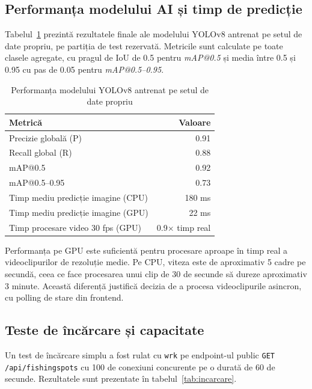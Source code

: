 \subsection{Performanța modelului AI și timp de predicție}

Tabelul~\ref{tab:performanta-ai} prezintă rezultatele finale ale modelului YOLOv8 antrenat pe setul de date propriu, pe partiția de test rezervată. Metricile sunt calculate pe toate clasele agregate, cu pragul de IoU de 0.5 pentru \textit{mAP@0.5} și media între 0.5 și 0.95 cu pas de 0.05 pentru \textit{mAP@0.5--0.95}.

\begin{table}[H]
\centering
\caption{Performanța modelului YOLOv8 antrenat pe setul de date propriu}
\label{tab:performanta-ai}
\begin{tabular}{lr}
\hline
\textbf{Metrică} & \textbf{Valoare} \\
\hline
Precizie globală (P)           & 0.91 \\
Recall global (R)              & 0.88 \\
mAP@0.5                        & 0.92 \\
mAP@0.5--0.95                  & 0.73 \\
Timp mediu predicție imagine (CPU) & 180 ms \\
Timp mediu predicție imagine (GPU) & 22 ms \\
Timp procesare video 30 fps (GPU)  & 0.9$\times$ timp real \\
\hline
\end{tabular}
\end{table}

Performanța pe GPU este suficientă pentru procesare aproape în timp real a videoclipurilor de rezoluție medie. Pe CPU, viteza este de aproximativ 5 cadre pe secundă, ceea ce face procesarea unui clip de 30 de secunde să dureze aproximativ 3 minute. Această diferență justifică decizia de a procesa videoclipurile asincron, cu polling de stare din frontend.

\subsection{Teste de încărcare și capacitate}

Un test de încărcare simplu a fost rulat cu \texttt{wrk} pe endpoint-ul public \texttt{GET /api/fishingspots} cu 100 de conexiuni concurente pe o durată de 60 de secunde. Rezultatele sunt prezentate în tabelul~\ref{tab:incarcare}.

